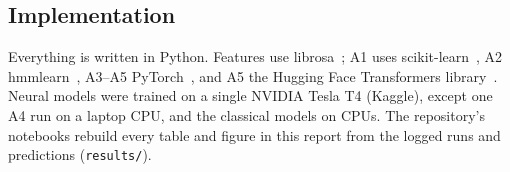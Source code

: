 \subsection{Implementation}
Everything is written in Python. Features use librosa~\cite{mcfee2015librosa}; A1 uses
scikit-learn~\cite{pedregosa2011scikit}, A2 hmmlearn~\cite{hmmlearn}, A3--A5 PyTorch~\cite{paszke2019pytorch}, and A5
the Hugging Face Transformers library~\cite{wolf2020transformers}. Neural models were trained on a single NVIDIA Tesla
T4 (Kaggle), except one A4 run on a laptop CPU, and the classical models on CPUs. The repository's notebooks rebuild
every table and figure in this report from the logged runs and predictions (\texttt{results/}).
